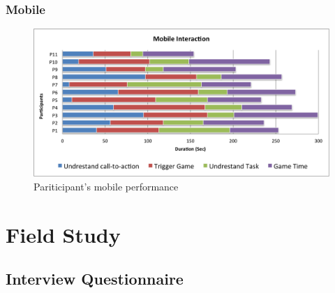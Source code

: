 \begin{appendices}
\subsection{Mobile}
\begin{figure}[H]
    \centering
    \includegraphics[width=\textwidth,height=0.35\textheight]{Appendices/6/mobile_performance}%
    \caption{Pariticipant's mobile performance}%
    \label{app:mobile_performance}%
\end{figure}

\newpage
\chapter{Field Study}

\setcounter{figure}{0}
\setcounter{table}{0}

\section{Interview Questionnaire}



\end{appendices}
